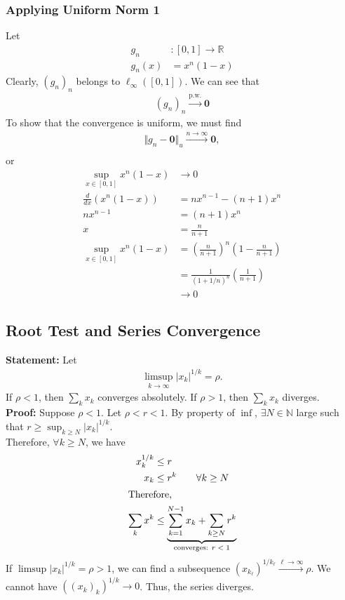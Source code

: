 \documentclass[10pt]{extarticle}
\renewcommand{\mathbf}[1]{\mathbold{#1}}
\newcommand{\N}{\mathbb{N}}
\newcommand{\R}{\mathbb{R}}
\begin{document}
    \subsubsection{Applying Uniform Norm 1}%
    Let
    \begin{align*}
      g_n&: [0,1] \rightarrow \R\\
      g_n(x) &= x^n(1-x)
    \end{align*}
    Clearly, $(g_n)_n$ belongs to $\ell_{\infty}([0,1])$. We can see that
    \begin{align*}
      (g_n)_n \xrightarrow{\text{p.w.}} \mathbf{0}
    \end{align*}
    To show that the convergence is uniform, we must find 
    \begin{align*}
      \Vert g_n - \mathbf{0}\Vert_u \xrightarrow{n\rightarrow\infty} \mathbf{0},\\
    \end{align*}
    or
    \begin{align*}
      \sup_{x\in[0,1]}x^n(1-x)&\rightarrow 0\\
      \frac{d}{dx}(x^n(1-x)) &= nx^{n-1} - (n+1)x^n\\
      nx^{n-1} &= (n+1)x^n\\
      x &= \frac{n}{n+1}\\
      \sup_{x\in[0,1]}x^n(1-x) &= \left(\frac{n}{n+1}\right)^n\left(1-\frac{n}{n+1}\right)\\
                               &= \frac{1}{(1+1/n)^n}\left(\frac{1}{n+1}\right)\\
                               &\rightarrow 0
    \end{align*}
  \subsection{Root Test and Series Convergence}%
    \textbf{Statement:} Let
    \begin{align*}
      \limsup_{k\rightarrow\infty}|x_k|^{1/k} = \rho.
    \end{align*}
    If $\rho < 1$, then $\sum_k x_k$ converges absolutely. If $\rho > 1$, then $\sum_k x_k$ diverges.\\

    \textbf{Proof:} Suppose $\rho < 1$. Let $\rho < r < 1$. By property of $\inf$, $\exists N\in \N$ large such that $r \geq \sup_{k\geq N}|x_k|^{1/k}$.\\

    Therefore, $\forall k\geq N$, we have
    \begin{align*}
      x_k^{1/k} &\leq r\\
      x_k &\leq r^k \tag*{$\forall k \geq N$}\\
      \shortintertext{Therefore,}
      \sum_k x^k &\leq \underbrace{\sum_{k=1}^{N-1} x_k + \sum_{k\geq N}r^k}_{\text{converges: $r < 1$}}
    \end{align*}
    If $\limsup |x_k|^{1/k} = \rho > 1$, we can find a subsequence $\left(x_{k_\ell}\right)^{1/{k_\ell}} \xrightarrow{\ell\rightarrow\infty} \rho$. We cannot have $\left((x_k)_k\right)^{1/k} \rightarrow 0$. Thus, the series diverges.
\end{document}
